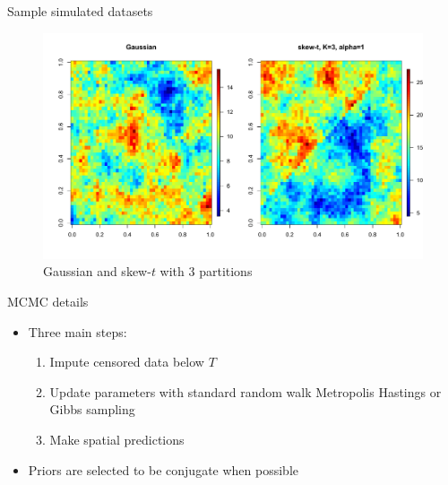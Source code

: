 \documentclass{beamer}
\begin{document}
\begin{frame}{Sample simulated datasets}
  \centering
  \begin{figure}
  \includegraphics[width=1\linewidth]{./plots/gauss-vs-skew-t3.pdf}
  \caption{Gaussian and skew-$t$ with 3 partitions}
  \end{figure}
\end{frame}

\begin{frame}{MCMC details}
  \begin{itemize} \setlength{\itemsep}{0.5em}
    \item Three main steps:
    \begin{enumerate}[1.]
      \item Impute censored data below $T$
      \item Update parameters with standard random walk Metropolis Hastings or Gibbs sampling
      \item Make spatial predictions
    \end{enumerate}
    \item Priors are selected to be conjugate when possible
  \end{itemize}
\end{frame}
\end{document}
